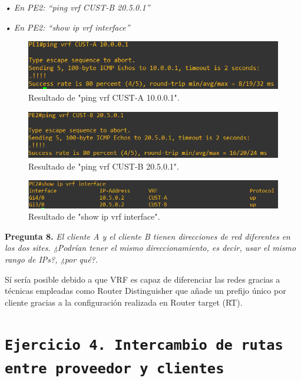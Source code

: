 \documentclass[a4paper, 12pt]{report}
\begin{document}
\textit{• En PE2: “ping vrf CUST-B 20.5.0.1”}

\textit{• En PE2: “show ip vrf interface”}

\begin{figure}[H]
	\centering
	\includegraphics[scale=0.7]{vrfpingpe1.png}
	\caption{Resultado de "ping vrf CUST-A 10.0.0.1".}
	\label{fig:vrfpingpe1}
\end{figure}

\begin{figure}[H]
	\centering
	\includegraphics[scale=0.7]{vrfpingpe2.png}
	\caption{Resultado de "ping vrf CUST-B 20.5.0.1".}
	\label{fig:vrfpingpe2}
\end{figure}
\begin{figure}[H]
	\centering
	\includegraphics[scale=0.7]{showipvrf.png}
	\caption{Resultado de "show ip vrf interface".}
	\label{fig:showipvrf}
\end{figure}
\textbf{Pregunta 8.}
\textit{El cliente A y el cliente B tienen direcciones de red diferentes en los dos sites. ¿Podrían tener
el mismo direccionamiento, es decir, usar el mismo rango de IPs?, ¿por qué?.}

Sí sería posible debido a que VRF es capaz de diferenciar las redes gracias a técnicas empleadas como Router Distinguisher que añade un prefijo único por cliente gracias a la configuración realizada en Router target (RT).
\newpage

\section{\texttt{Ejercicio 4. Intercambio de rutas entre proveedor y clientes}}
\end{document}
